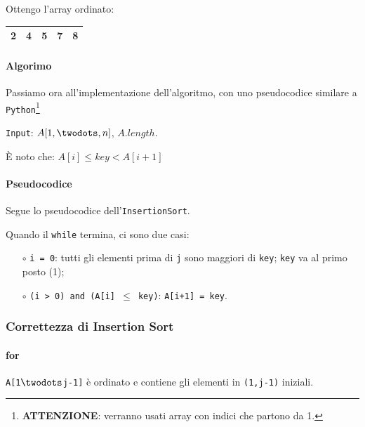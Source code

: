 \smallskip
\noindent Ottengo l'array ordinato:

\begin{center}
	\begin{tabular}{|l|l|l|l|l|}
		\hline
		2 & 4 & 5 & 7 & 8 \\
		\hline
	\end{tabular}
\end{center}

\newpage

\paragraph{Algorimo} Passiamo ora all'implementazione dell'algoritmo, con uno pseudocodice similare a \texttt{Python}\footnote{\textbf{ATTENZIONE}: verranno usati array con indici
che partono da 1.}\par

\bigskip

\texttt{Input}: $A[1, \twodots ,n]$, $A.length$.

\begin{center}
	È noto che: 
	$A[i] \leq key < A[i+1]$
\end{center}

\paragraph{Pseudocodice} Segue lo pseudocodice dell'\texttt{InsertionSort}.



\vspace{0.5cm}

Quando il \texttt{while} termina, ci sono due casi: 
\begin{itemize}
	\item[$\circ$] \texttt{i = 0}: tutti gli elementi prima di \texttt{j} 
	sono maggiori di \texttt{key}; \texttt{key} va al primo posto (1);
	\item[$\circ$] \texttt{(i > 0) and (A[i] $\leq$ key)}: \texttt{A[i+1] = key}.
\end{itemize}

\subsubsection{Correttezza di Insertion Sort}

\paragraph{for} \texttt{A[1$\twodots$j-1]} è ordinato e contiene gli 
elementi in \texttt{(1,j-1)} iniziali.

